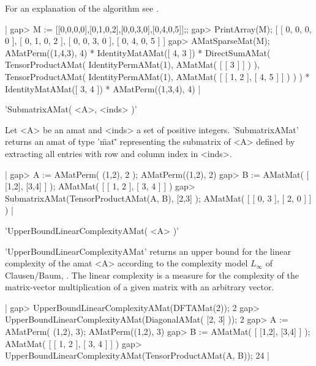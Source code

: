 For an explanation of the algorithm see \cite{Egn97}.

|    gap> M := [[0,0,0,0],[0,1,0,2],[0,0,3,0],[0,4,0,5]];; 
    gap> PrintArray(M);
    [ [  0,  0,  0,  0 ],
      [  0,  1,  0,  2 ],
      [  0,  0,  3,  0 ],
      [  0,  4,  0,  5 ] ]
    gap> AMatSparseMat(M);
    AMatPerm((1,4,3), 4) *
    IdentityMatAMat([ 4, 3 ]) *
    DirectSumAMat(
      TensorProductAMat(
        IdentityPermAMat(1),
        AMatMat(
          [ [ 3 ] ]
        )
      ),
      TensorProductAMat(
        IdentityPermAMat(1),
        AMatMat(
          [ [ 1, 2 ], [ 4, 5 ] ]
        )
      )
    ) *
    IdentityMatAMat([ 3, 4 ]) *
    AMatPerm((1,3,4), 4) |


'SubmatrixAMat( <A>, <inds> )'

Let <A> be an amat and <inds> a set of positive integers. 
'SubmatrixAMat' returns an amat of type '\"mat\"' representing 
the submatrix of <A> defined by extracting all entries with
row and column index in <inds>. 

|    gap> A := AMatPerm( (1,2), 2 );
    AMatPerm((1,2), 2)
    gap> B := AMatMat( [ [1,2], [3,4] ] );
    AMatMat(
      [ [ 1, 2 ], [ 3, 4 ] ]
    )
    gap> SubmatrixAMat(TensorProductAMat(A, B), [2,3] );
    AMatMat(
      [ [ 0, 3 ], [ 2, 0 ] ]
    ) |


'UpperBoundLinearComplexityAMat( <A> )'

'UpperBoundLinearComplexityAMat' returns an upper bound for the linear
complexity of the amat <A> according to the complexity model
$L_\infty$ of Clausen/Baum, \cite{CB93}. The linear complexity is
a measure for the complexity of the matrix-vector multiplication of a
given matrix with an arbitrary vector.

|    gap> UpperBoundLinearComplexityAMat(DFTAMat(2));
    2
    gap> UpperBoundLinearComplexityAMat(DiagonalAMat( [2, 3] ));
    2
    gap> A := AMatPerm( (1,2), 3);
    AMatPerm((1,2), 3)
    gap> B := AMatMat( [ [1,2], [3,4] ] );
    AMatMat(
      [ [ 1, 2 ], [ 3, 4 ] ]
    )
    gap> UpperBoundLinearComplexityAMat(TensorProductAMat(A, B));
    24 |


